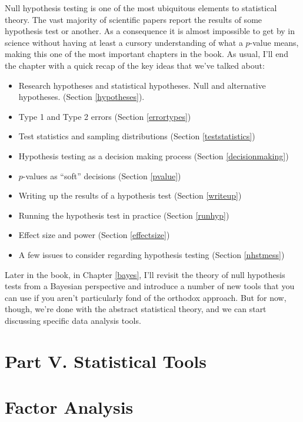 \documentclass[
]{book}
\providecommand{\tightlist}{%
  \setlength{\itemsep}{0pt}\setlength{\parskip}{0pt}}
\begin{document}
Null hypothesis testing is one of the most ubiquitous elements to statistical theory. The vast majority of scientific papers report the results of some hypothesis test or another. As a consequence it is almost impossible to get by in science without having at least a cursory understanding of what a \(p\)-value means, making this one of the most important chapters in the book. As usual, I'll end the chapter with a quick recap of the key ideas that we've talked about:

\begin{itemize}
\tightlist
\item
  Research hypotheses and statistical hypotheses. Null and alternative hypotheses. (Section \ref{hypotheses}).
\item
  Type 1 and Type 2 errors (Section \ref{errortypes})
\item
  Test statistics and sampling distributions (Section \ref{teststatistics})
\item
  Hypothesis testing as a decision making process (Section \ref{decisionmaking})
\item
  \(p\)-values as ``soft'' decisions (Section \ref{pvalue})
\item
  Writing up the results of a hypothesis test (Section \ref{writeup})
\item
  Running the hypothesis test in practice (Section \ref{runhyp})
\item
  Effect size and power (Section \ref{effectsize})
\item
  A few issues to consider regarding hypothesis testing (Section \ref{nhstmess})
\end{itemize}

Later in the book, in Chapter \ref{bayes}, I'll revisit the theory of null hypothesis tests from a Bayesian perspective and introduce a number of new tools that you can use if you aren't particularly fond of the orthodox approach. But for now, though, we're done with the abstract statistical theory, and we can start discussing specific data analysis tools.

\hypertarget{part-v.-statistical-tools}{%
\chapter*{Part V. Statistical Tools}\label{part-v.-statistical-tools}}

\hypertarget{factoranalysis}{%
\chapter{Factor Analysis}\label{factoranalysis}}
\end{document}
